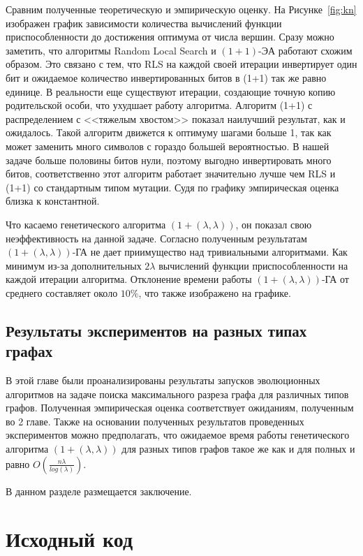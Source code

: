 \documentclass[times]{itmo-student-thesis}
\newcommand{\alglambda}{${(1 + (\lambda , \lambda))}$\xspace}
\newcommand{\alglambdaf}{${(1 + (\lambda , \lambda))}$-ГА\xspace}
\newcommand{\oea}{\mbox{$(1 + 1)$-ЭА}\xspace}
\newcommand{\ollga}{${(1 + (\lambda , \lambda))}$-ГА\xspace}
\begin{document}
Сравним полученные теоретическую и эмпирическую оценку.
На Рисунке~\ref{fig:kn} изображен график зависимости количества вычислений функции приспособленности до достижения оптимума от числа вершин.
Сразу можно заметить, что алгоритмы Random Local Search и \oea работают схожим образом.
Это связано с тем, что RLS на каждой своей итерации инвертирует один бит и ожидаемое количество инвертированных битов в (1+1) так же равно единице. В реальности еще существуют итерации, создающие точную копию родительской особи, что ухудшает работу алгоритма.
Алгоритм (1+1) с распределением с <<тяжелым хвостом>> показал наилучший результат, как и ожидалось. Такой алгоритм движется к оптимуму шагами больше 1, так как может заменить много символов с гораздо большей вероятностью. В нашей задаче больше половины битов нули, поэтому выгодно инвертировать много битов, соответственно этот алгоритм работает значительно лучше чем RLS и (1+1) со стандартным типом мутации. Судя по графику эмпирическая оценка близка к константной.

Что касаемо генетического алгоритма \alglambda, он показал свою неэффективность на данной задаче. Согласно полученным результатам \alglambdaf не дает приимущество над тривиальными алгоритмами. Как минимум из-за дополнительных $2\lambda$ вычислений функции приспособленности на каждой итерации алгоритма.
Отклонение времени работы \alglambdaf от среднего составляет около $10\%$, что также изображено на графике.

\section{Результаты экспериментов на разных типах графах}


\chapterconclusion
В этой главе были проанализированы результаты запусков эволюционных алгоритмов на задаче поиска максимального разреза графа для различных типов графов. Полученная эмпирическая оценка соответствует ожиданиям, полученным во 2 главе.
Также на основании полученных результатов проведенных экспериментов можно предполагать, что ожидаемое время работы генетического алгоритма \alglambda для разных типов графов такое же как и для полных и равно $O(\frac{n\lambda}{log(\lambda)})$.

\finishrelatedwork

\startconclusionpage

В данном разделе размещается заключение.

\printmainbibliography

\appendix

\chapter{Исходный код}\label{sec:app:1}

\begin{lstlisting}[caption={Реализация \ollga со сбором статистики},label={ollgaStat}]

\end{lstlisting}
\end{document}
